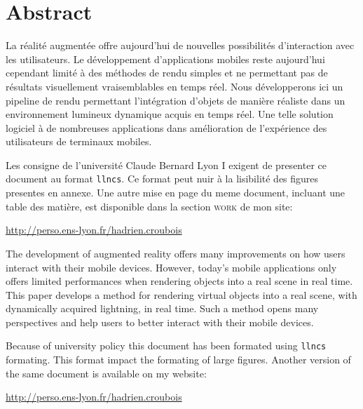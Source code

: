 \documentclass[10pt,a4paper,twoside, twocolumn]{report}
\begin{document}
\vfill

{}
\section*{Abstract}


  \vfill
  
	La réalité augmentée offre aujourd'hui de nouvelles possibilités d’interaction avec les utilisateurs. Le développement d'applications mobiles reste aujourd'hui cependant limité à des méthodes de rendu simples et ne permettant pas de résultats visuellement vraisemblables en temps réel. Nous développerons ici un pipeline de rendu permettant l’intégration d'objets de manière réaliste dans un environnement lumineux dynamique acquis en temps réel. Une telle solution logiciel à de nombreuses applications dans amélioration de l’expérience des utilisateurs de terminaux mobiles.

	\ifllncs
	Les consigne de l'université Claude Bernard Lyon I exigent de presenter ce document au format \texttt{llncs}. Ce format peut nuir à la lisibilité des figures presentes en annexe. Une autre mise en page du meme document, incluant une table des matière, est disponible dans la section \textsc{work} de mon site:

	\begin{center}\href{http://perso.ens-lyon.fr/hadrien.croubois}{http://perso.ens-lyon.fr/hadrien.croubois}\end{center}
	\fi

	\vspace{1cm}

	The development of augmented reality offers many improvements on how users interact with their mobile devices. However, today's mobile applications only offers limited performances when rendering objects into a real scene in real time. This paper develops a method for rendering virtual objects into a real scene, with dynamically acquired lightning, in real time. Such a method opens many perspectives and help users to better interact with their mobile devices.
	
	\ifllncs
	Because of university policy this document has been formated using \texttt{llncs} formating. This format impact the formating of large figures. Another version of the same document is available on my website:

	\begin{center}\href{http://perso.ens-lyon.fr/hadrien.croubois}{http://perso.ens-lyon.fr/hadrien.croubois}\end{center}
	\fi
\end{document}
